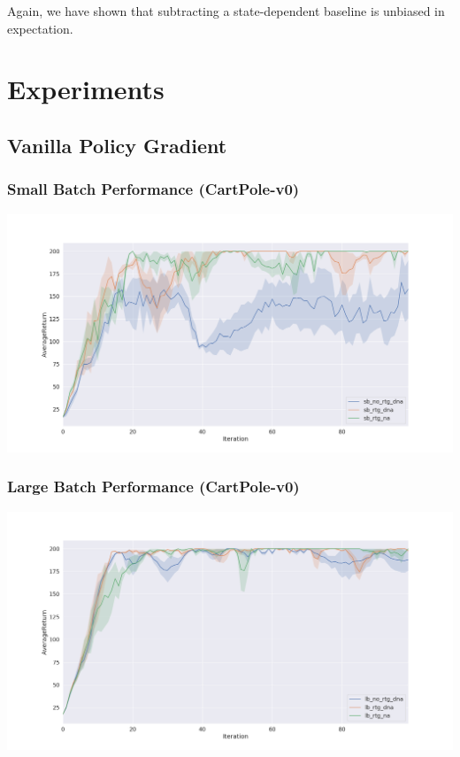 \documentclass{article}
\begin{document}
    Again, we have shown that subtracting a state-dependent baseline is unbiased
    in expectation.

    \section{Experiments}

    \subsection{Vanilla Policy Gradient}

    \subsubsection{Small Batch Performance (CartPole-v0)}
    \begin{center}
        \noindent\includegraphics[scale=0.29]{smallBatchCartpole}
    \end{center}

    \subsubsection{Large Batch Performance (CartPole-v0)}
    \begin{center}
        \noindent\includegraphics[scale=0.29]{largeBatchCartpole}
    \end{center}
\end{document}
